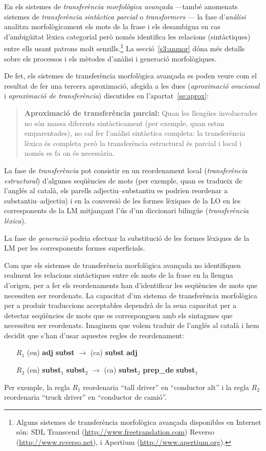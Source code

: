 En els sistemes de \emph{transferència morfològica avançada} ---també
anomenats sistemes de \emph{transferència sintàctica parcial} o
\emph{transformers} \citep[4.2]{arnold94b}--- la fase d'\emph{anàlisi}
analitza morfològicament els mots de la frase i els desambigua en cas
d'ambigüitat lèxica categorial però només identifica les relacions
(sintàctiques) entre ells usant patrons molt senzills.\footnote{Alguns
  sistemes de transferència morfològica avançada disponibles en
  Internet són: SDL Transcend (\url{http://www.freetranslation.com})
  Reverso (\url{http://www.reverso.net}), i Apertium
  (\url{http://www.apertium.org}).}  La secció~\ref{s3:anmor} dóna més
detalls sobre els processos i els mètodes d'anàlisi i generació
morfològiques.

De fet, els sistemes de transferència morfològica avançada es poden
veure com el resultat de fer una tercera aproximació, afegida a les
dues (\emph{aproximació oracional} i \emph{aproximació de
  transferència}) discutides en l'apartat~\ref{se:aprox}:
\begin{quote}
  \textbf{Aproximació de transferència parcial:} Quan les llengües
  involucrades no són massa diferents sintàcticament (per exemple,
  quan estan emparentades), no cal fer l'anàlisi sintàctica completa:
  la transferència lèxica és completa però la transferència
  estructural és parcial i local i només es fa on és necessària.
\end{quote}

La fase de \emph{transferència} pot consistir en un reordenament local
(\emph{transferència estructural}) d'algunes seqüències de mots (per
exemple, quan es tradueix de l'anglés al català, els parells
adjectiu--substantiu es podrien reordenar a substantiu--adjectiu) i en
la conversió de les formes lèxiques de la LO en les corresponents de
la LM mitjançant l'ús d'un diccionari bilingüe (\emph{transferència
  lèxica}).

La fase de \emph{generació} podria efectuar la substitució de les
formes lèxiques de la LM per les corresponents formes superficials.

Com que els sistemes de transferència morfològica avançada no
identifiquen realment les relacions sintàctiques entre els mots de la
frase en la llengua d'origen, per a fer els reordenaments han
d'identificar les seqüències de mots que necessiten ser reordenats. La
capacitat d'un sistema de transferència morfològica per a produir
traduccions acceptables dependrà de la seua capacitat per a detectar
seqüències de mots que es corresponguen amb els sintagmes que
necessiten ser reordenats.  Imaginem que volem traduir de l'anglés al
català i hem decidit que s'han d'usar aquestes regles de reordenament:
\begin{itemize}
\item [$R_1$] (en) \textbf{adj} \textbf{subst} $\rightarrow$ (ca)
  \textbf{subst} \textbf{adj}
\item [$R_2$] (en) \textbf{subst}$_1$ \textbf{subst}$_2$ $\rightarrow$
  (ca) \textbf{subst}$_2$ \textbf{prep\_de} \textbf{subst}$_1$
\end{itemize}
Per exemple, la regla $R_1$ reordenaria ``tall driver'' en
``conductor alt'' i la regla $R_2$ reordenaria ``truck driver''
en ``conductor de camió''. 

